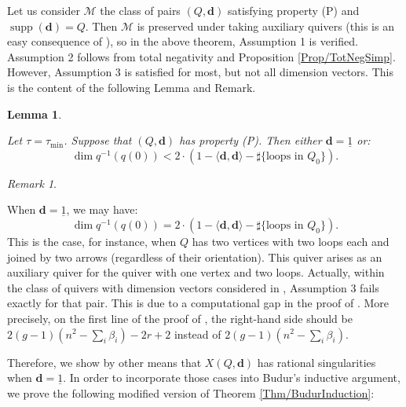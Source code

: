 \documentclass[11pt,english]{article}
\numberwithin{equation}{section}
\numberwithin{figure}{section}
\theoremstyle{definition}
\theoremstyle{plain}
\newtheorem{lem}[df]{Lemma}
\theoremstyle{remark}
\newtheorem{rmk}[df]{Remark}
\DeclareMathOperator{\supp}{supp}
\newcommand\dd{\mathbf{d}}
\begin{document}
Let us consider $\mathcal{M}$ the class of pairs $(Q,\dd)$ satisfying
property (P) and $\supp(\dd)=Q$. Then $\mathcal{M}$ is preserved
under taking auxiliary quivers (this is an easy consequence of \cite[Prop. 2.11.]{Bud21}),
so in the above theorem, Assumption 1 is verified. Assumption 2 follows
from total negativity and Proposition \ref{Prop/TotNegSimp}. However,
Assumption 3 is satisfied for most, but not all dimension vectors.
This is the content of the following Lemma and Remark.

\begin{lem} \label{Lem/DimBoundTotNeg}

Let $\tau=\tau_{\min}$. Suppose that $(Q,\dd)$ has property (P).
Then either $\dd=\underline{1}$ or:\[
\dim q^{-1}(q(0))<2\cdot(1-\langle\dd,\dd\rangle-\sharp\{\text{loops in } Q_0\}).
\]\end{lem}

\begin{rmk} \label{Rmk/BoundFailure}

When $\dd=\underline{1}$, we may have:\[
\dim q^{-1}(q(0))=2\cdot(1-\langle\dd,\dd\rangle-\sharp\{\text{loops in } Q_0\}).
\]This is the case, for instance, when $Q$ has two vertices with two
loops each and joined by two arrows (regardless of their orientation).
This quiver arises as an auxiliary quiver for the quiver with one
vertex and two loops. Actually, within the class of quivers with dimension
vectors considered in \cite[Prop. 2.26.]{Bud21}, Assumption 3 fails
exactly for that pair. This is due to a computational gap in the proof
of \cite[Prop. 2.23.]{Bud21}. More precisely, on the first line of
the proof of \cite[Prop. 2.23.]{Bud21}, the right-hand side should
be $2(g-1)(n^{2}-\sum_{i}\beta_{i})-2r+2$ instead of $2(g-1)(n^{2}-\sum_{i}\beta_{i})$.

\end{rmk}

Therefore, we show by other means that $X(Q,\dd)$ has rational singularities
when $\dd=\underline{1}$. In order to incorporate those cases into
Budur's inductive argument, we prove the following modified version
of Theorem \ref{Thm/BudurInduction}:
\end{document}

